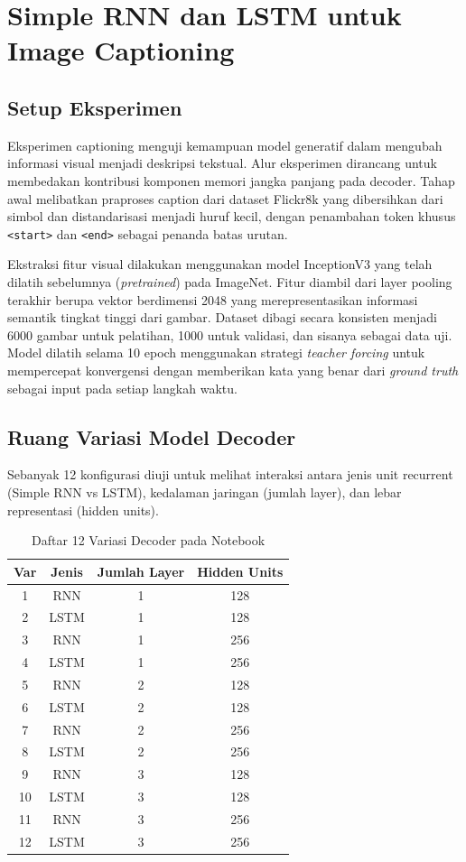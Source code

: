 \section{Simple RNN dan LSTM untuk Image Captioning}

\subsection{Setup Eksperimen}

Eksperimen captioning menguji kemampuan model generatif dalam mengubah informasi visual menjadi deskripsi tekstual. Alur eksperimen dirancang untuk membedakan kontribusi komponen memori jangka panjang pada decoder. Tahap awal melibatkan praproses caption dari dataset Flickr8k yang dibersihkan dari simbol dan distandarisasi menjadi huruf kecil, dengan penambahan token khusus \texttt{<start>} dan \texttt{<end>} sebagai penanda batas urutan.

Ekstraksi fitur visual dilakukan menggunakan model InceptionV3 yang telah dilatih sebelumnya (\textit{pretrained}) pada ImageNet. Fitur diambil dari layer pooling terakhir berupa vektor berdimensi 2048 yang merepresentasikan informasi semantik tingkat tinggi dari gambar. Dataset dibagi secara konsisten menjadi 6000 gambar untuk pelatihan, 1000 untuk validasi, dan sisanya sebagai data uji. Model dilatih selama 10 epoch menggunakan strategi \textit{teacher forcing} untuk mempercepat konvergensi dengan memberikan kata yang benar dari \textit{ground truth} sebagai input pada setiap langkah waktu.

\subsection{Ruang Variasi Model Decoder}

Sebanyak 12 konfigurasi diuji untuk melihat interaksi antara jenis unit recurrent (Simple RNN vs LSTM), kedalaman jaringan (jumlah layer), dan lebar representasi (hidden units).

\begin{table}[H]
	\centering
	\caption{Daftar 12 Variasi Decoder pada Notebook}
	\begin{tabular}{cccc}
		\toprule
		\textbf{Var} & \textbf{Jenis} & \textbf{Jumlah Layer} & \textbf{Hidden Units} \\
		\midrule
		1 & RNN & 1 & 128 \\
		2 & LSTM & 1 & 128 \\
		3 & RNN & 1 & 256 \\
		4 & LSTM & 1 & 256 \\
		5 & RNN & 2 & 128 \\
		6 & LSTM & 2 & 128 \\
		7 & RNN & 2 & 256 \\
		8 & LSTM & 2 & 256 \\
		9 & RNN & 3 & 128 \\
		10 & LSTM & 3 & 128 \\
		11 & RNN & 3 & 256 \\
		12 & LSTM & 3 & 256 \\
		\bottomrule
	\end{tabular}
	\label{tab:caption-12-vars}
\end{table}

